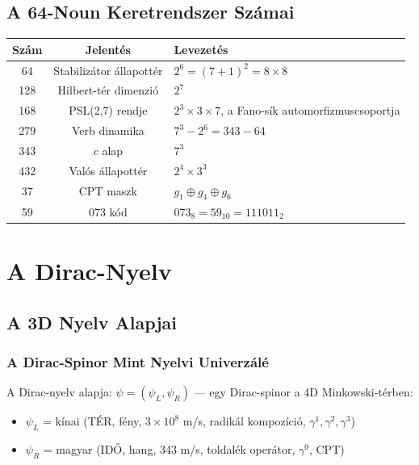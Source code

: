 \documentclass[11pt,a4paper,twoside]{book}
\begin{document}
\chapter{A 64-Noun Keretrendszer Számai}

\begin{center}
\begin{tabular}{c|c|l}
\textbf{Szám} & \textbf{Jelentés} & \textbf{Levezetés} \\
\hline
64 & Stabilizátor állapottér & $2^6 = (7+1)^2 = 8\times8$ \\
128 & Hilbert-tér dimenzió & $2^7$ \\
168 & PSL(2,7) rendje & $2^3\times3\times7$, a Fano-sík automorfizmuscsoportja \\
279 & Verb dinamika & $7^3 - 2^6 = 343 - 64$ \\
343 & $c$ alap & $7^3$ \\
432 & Valós állapottér & $2^4 \times 3^3$ \\
37 & CPT maszk & $g_1 \oplus g_4 \oplus g_6$ \\
59 & 073 kód & $073_8 = 59_{10} = 111011_2$ \\
\end{tabular}
\end{center}


\part{A Dirac-Nyelv}

\chapter{A 3D Nyelv Alapjai}

\section{A Dirac-Spinor Mint Nyelvi Univerzálé}

A Dirac-nyelv alapja: $\psi = (\psi_L, \psi_R)$ — egy Dirac-spinor a 4D Minkowski-térben:

\begin{itemize}
  \item $\psi_L$ = kínai (TÉR, fény, $3\times10^8$ m/s, radikál kompozíció, $\gamma^1,\gamma^2,\gamma^3$)
  \item $\psi_R$ = magyar (IDŐ, hang, 343 m/s, toldalék operátor, $\gamma^0$, CPT)
\end{itemize}
\end{document}
